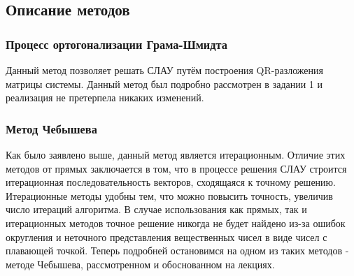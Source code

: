 \documentclass[a4paper,12pt,titlepage,final]{article}
\begin{document}
\subsection{Описание методов}
\subsubsection{Процесс ортогонализации Грама-Шмидта}
Данный метод позволяет решать СЛАУ путём построения QR-разложения матрицы системы. Данный метод был подробно рассмотрен в задании 1 и реализация не претерпела никаких изменений.
\subsubsection{Метод Чебышева}
Как было заявлено выше, данный метод является итерационным. Отличие этих методов от прямых заключается в том, что в процессе решения СЛАУ строится итерационная последовательность векторов, сходящаяся к точному решению. Итерационные методы удобны тем, что можно повысить точность, увеличив число итераций алгоритма. В случае использования как прямых, так и итерационных методов точное решение никогда не будет найдено из-за ошибок округления и неточного представления вещественных чисел в виде чисел с плавающей точкой. Теперь подробней остановимся на одном из таких методов - методе Чебышева, рассмотренном и обоснованном на лекциях.
\end{document}

